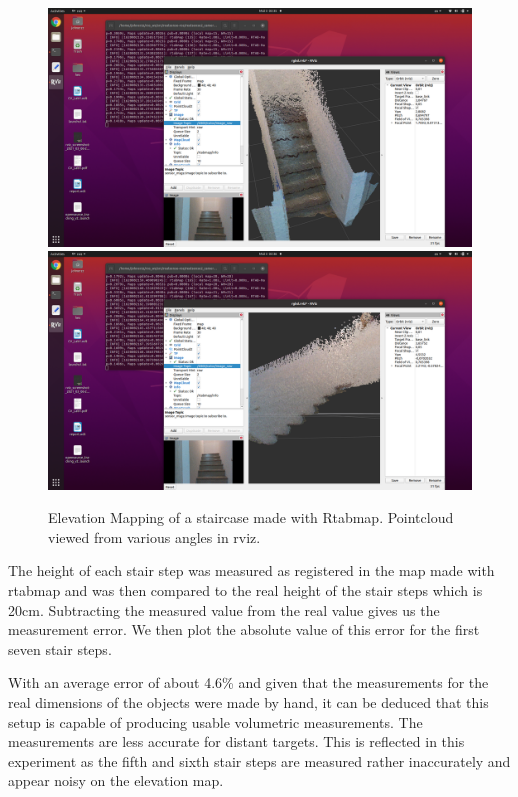 \documentclass{article}
\begin{document}
\begin{figure}[h] %
    \centering
	\includegraphics[width=\textwidth,height=\textheight,keepaspectratio,trim={18cm 0 4cm 8cm},clip]{report1-img013.png} %
	\includegraphics[width=\textwidth,height=\textheight,keepaspectratio,trim={18cm 0 4cm 8cm},clip]{report1-img012.png} %
	\caption{Elevation Mapping of a staircase made with Rtabmap. Pointcloud viewed from various angles in rviz. }
\end{figure}

\clearpage
\bigskip
\bigskip
\bigskip
\bigskip


The height of each stair step was measured as registered in the map made with rtabmap and was then compared to the real height of the stair steps which is 20cm. Subtracting the measured value from the real value gives us the measurement error. We then plot the absolute value of this error for the first seven stair steps.

With an average error of about 4.6\% and given that the measurements for the real dimensions of the objects were made by hand, it can be deduced that this setup is capable of producing usable volumetric measurements. The measurements are less accurate for distant targets. This is reflected in this experiment as the fifth and sixth stair steps are measured rather inaccurately and appear noisy on the elevation map. 
\end{document}
